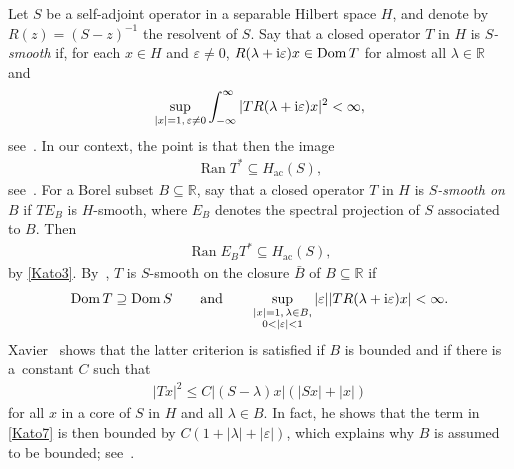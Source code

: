 \documentclass[pdftex]{sigma}
\numberwithin{equation}{section}
\DeclareMathOperator{\dom}{Dom}
\DeclareMathOperator{\ran}{Ran}
\def\ac{\mathrm{ac}}
\def\R{\mathbb R}
\def\ve{\varepsilon}
\begin{document}
Let $S$ be a self-adjoint operator in a separable Hilbert space $H$,
and denote by $R(z)=(S-z)^{-1}$ the resolvent of $S$.
Say that a closed operator $T$ in $H$ is \emph{$S$-smooth} if, for each $x\in H$ and $\ve\ne0$,
$R(\lambda+{\rm i}\ve)x\in\dom T$
 for almost all $\lambda\in\R$ and
\begin{align*}%
 \sup_{|x|=1,\,\ve\ne0} \int_{-\infty}^\infty |TR(\lambda+{\rm i}\ve)x|^2 < \infty,
\end{align*}
see~\cite[p.~142]{ReedSimon78}.
In our context, the point is that then the image
\begin{align}\label{Kato3}
 \ran T^* \subseteq H_{\ac}(S),
\end{align}
see~\cite[Theorem XIII.23]{ReedSimon78}.
For a Borel subset $B\subseteq\R$,
say that a closed operator $T$ in $H$ is \emph{$S$-smooth on $B$} if $TE_B$ is $H$-smooth,
where $E_B$ denotes the spectral projection of $S$ associated to $B$.
Then
\begin{align*}%
 \ran E_BT^* \subseteq H_{\ac}(S),
\end{align*}
by \eqref{Kato3}.
By~\cite[Theorem XIII.30]{ReedSimon78}, $T$ is $S$-smooth on the closure $\bar B$ of $B\subseteq\R$ if
\begin{align}\label{Kato7}
 \dom T\supseteq\dom S
 \qquad\text{and}\qquad
 \sup_{\substack{|x|=1, \, \lambda\in B,\\ 0<|\ve|<1}} |\ve||TR(\lambda+{\rm i}\ve)x| < \infty.
\end{align}
Xavier~\cite[p.~581f.]{Xavier1988} shows that the latter criterion is satisfied
if $B$ is bounded and if there is a~constant $C$ such that
\begin{align}\label{Kato9}
 |Tx|^2 \le C|(S-\lambda)x|(|Sx|+|x|)
\end{align}
for all $x$ in a core of $S$ in $H$ and all $\lambda\in B$.
In fact, he shows that the term in \eqref{Kato7} is then bounded by $C(1+|\lambda|+|\ve|)$,
which explains why $B$ is assumed to be bounded; see~\cite[top of~p.~582]{Xavier1988}.
\end{document}
